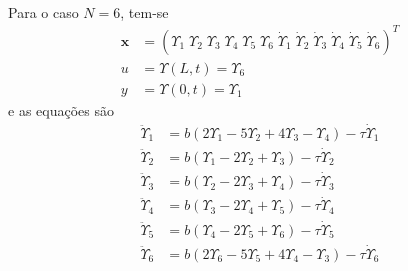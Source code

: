 \documentclass[a4paper,11pt]{scrartcl} %
\numberwithin{equation}{section} %
\numberwithin{figure}{section} %
\numberwithin{table}{section} %
\begin{document}
\paragraph{} Para o caso $N=6$, tem-se \begin{align}
\mathbf{x} &= \left(\Upsilon_1\;\Upsilon_2\;\Upsilon_3\;\Upsilon_4\;\Upsilon_5\;\Upsilon_6\;\dot{\Upsilon}_1\;\dot{\Upsilon}_2\;\dot{\Upsilon}_3\;\dot{\Upsilon}_4\;\dot{\Upsilon}_5\;\dot{\Upsilon}_6\right)^T 	\\
u &= \Upsilon(L,t) = \Upsilon_6\label{ufor6}\\
y &= \Upsilon(0,t) = \Upsilon_1\label{yfor6}
 \end{align} e as equações são \begin{align}
 	\ddot{\Upsilon}_1 &=  b\left(2\Upsilon_{1}-5\Upsilon_{2} + 4\Upsilon_{3} -\Upsilon_{4}\right)-\tau \dot{\Upsilon}_1\\
 	\ddot{\Upsilon}_2 &=  b\left(\Upsilon_{1}-2\Upsilon_{2} + \Upsilon_{3}\right)-\tau \dot{\Upsilon}_2\\
 	\ddot{\Upsilon}_3 &=  b\left(\Upsilon_{2}-2\Upsilon_{3} + \Upsilon_{4}\right)-\tau \dot{\Upsilon}_3\\
 	\ddot{\Upsilon}_4 &=  b\left(\Upsilon_{3}-2\Upsilon_{4} + \Upsilon_{5}\right)-\tau \dot{\Upsilon}_4\\
 	\ddot{\Upsilon}_5 &=  b\left(\Upsilon_{4}-2\Upsilon_{5} + \Upsilon_{6}\right)-\tau \dot{\Upsilon}_5\\
 	\ddot{\Upsilon}_6 &=  b\left(2\Upsilon_{6}-5\Upsilon_{5} + 4\Upsilon_{4} -\Upsilon_{3}\right)-\tau \dot{\Upsilon}_6
 \end{align}
\end{document}
